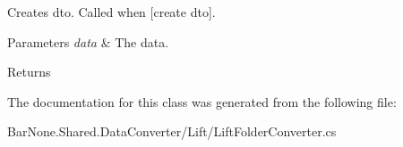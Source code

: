 Creates dto. Called when \mbox{[}create dto\mbox{]}. 


\begin{DoxyParams}{Parameters}
{\em data} & The data.\\
\hline
\end{DoxyParams}
\begin{DoxyReturn}{Returns}

\end{DoxyReturn}


The documentation for this class was generated from the following file\+:\begin{DoxyCompactItemize}
\item 
Bar\+None.\+Shared.\+Data\+Converter/\+Lift/Lift\+Folder\+Converter.\+cs\end{DoxyCompactItemize}
